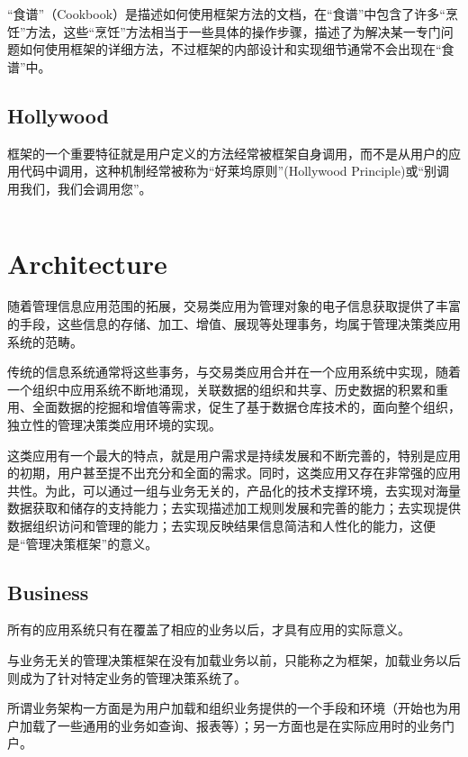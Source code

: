 “食谱”（Cookbook）是描述如何使用框架方法的文档，在“食谱”中包含了许多“烹饪”方法，这些“烹饪”方法相当于一些具体的操作步骤，描述了为解决某一专门问题如何使用框架的详细方法，不过框架的内部设计和实现细节通常不会出现在“食谱”中。

\subsection{Hollywood}

框架的一个重要特征就是用户定义的方法经常被框架自身调用，而不是从用户的应用代码中调用，这种机制经常被称为“好莱坞原则”(Hollywood Principle)或“别调用我们，我们会调用您”。


\begin{lstlisting}[language=PHP]

\end{lstlisting}

\section{Architecture}



随着管理信息应用范围的拓展，交易类应用为管理对象的电子信息获取提供了丰富的手段，这些信息的存储、加工、增值、展现等处理事务，均属于管理决策类应用系统的范畴。

传统的信息系统通常将这些事务，与交易类应用合并在一个应用系统中实现，随着一个组织中应用系统不断地涌现，关联数据的组织和共享、历史数据的积累和重用、全面数据的挖掘和增值等需求，促生了基于数据仓库技术的，面向整个组织，独立性的管理决策类应用环境的实现。

这类应用有一个最大的特点，就是用户需求是持续发展和不断完善的，特别是应用的初期，用户甚至提不出充分和全面的需求。同时，这类应用又存在非常强的应用共性。为此，可以通过一组与业务无关的，产品化的技术支撑环境，去实现对海量数据获取和储存的支持能力；去实现描述加工规则发展和完善的能力；去实现提供数据组织访问和管理的能力；去实现反映结果信息简洁和人性化的能力，这便是“管理决策框架”的意义。


\subsection{Business}


所有的应用系统只有在覆盖了相应的业务以后，才具有应用的实际意义。

与业务无关的管理决策框架在没有加载业务以前，只能称之为框架，加载业务以后则成为了针对特定业务的管理决策系统了。

所谓业务架构一方面是为用户加载和组织业务提供的一个手段和环境（开始也为用户加载了一些通用的业务如查询、报表等）；另一方面也是在实际应用时的业务门户。

